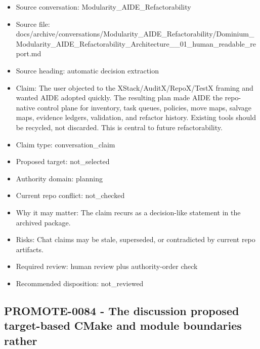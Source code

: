 \documentclass[11pt,a4paper]{report}
\begin{document}
\begin{itemize}
\item Source conversation: Modularity\_AIDE\_Refactorability
\item Source file: docs/archive/conversations/Modularity\_AIDE\_Refactorability/Dominium\_Modularity\_AIDE\_Refactorability\_Architecture\_\_01\_human\_readable\_report.md
\item Source heading: automatic decision extraction
\item Claim: The user objected to the XStack/AuditX/RepoX/TestX framing and wanted AIDE adopted quickly. The resulting plan made AIDE the repo-native control plane for inventory, task queues, policies, move maps, salvage maps, evidence ledgers, validation, and refactor history. Existing tools should be recycled, not discarded. This is central to future refactorability.
\item Claim type: conversation\_claim
\item Proposed target: not\_selected
\item Authority domain: planning
\item Current repo conflict: not\_checked
\item Why it may matter: The claim recurs as a decision-like statement in the archived package.
\item Risks: Chat claims may be stale, superseded, or contradicted by current repo artifacts.
\item Required review: human review plus authority-order check
\item Recommended disposition: not\_reviewed
\end{itemize}

\subsection{PROMOTE-0084 - The discussion proposed target-based CMake and module boundaries rather}
\end{document}

